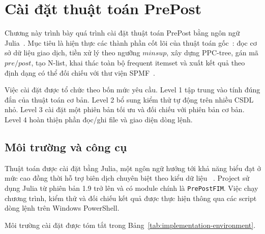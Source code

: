 \section{Cài đặt thuật toán PrePost}
\label{sec:implementation}

Chương này trình bày quá trình cài đặt thuật toán PrePost bằng ngôn ngữ
Julia~\cite{bezanson2017julia}. Mục tiêu là hiện thực các thành phần cốt lõi
của thuật toán gốc~\cite{deng2012prepost}: đọc cơ sở dữ liệu giao dịch, tiền xử
lý theo ngưỡng $\mathit{minsup}$, xây dựng PPC-tree, gán mã $pre/post$, tạo
N-list, khai thác toàn bộ frequent itemset và xuất kết quả theo định dạng có
thể đối chiếu với thư viện SPMF~\cite{fournier2014spmf,spmfwebsite}.

Việc cài đặt được tổ chức theo bốn mức yêu cầu. Level 1 tập trung vào tính đúng đắn của thuật toán cơ bản. Level 2 bổ sung kiểm thử tự động trên nhiều CSDL nhỏ. Level 3 cài đặt một phiên bản tối ưu và đối chiếu với phiên bản cơ bản. Level 4 hoàn thiện phần đọc/ghi file và giao diện dòng lệnh.

\subsection{Môi trường và công cụ}
\label{subsec:implementation-environment}

Thuật toán được cài đặt bằng Julia, một ngôn ngữ hướng tới khả năng biểu đạt
ở mức cao đồng thời hỗ trợ biên dịch chuyên biệt theo kiểu dữ liệu
~\cite{bezanson2017julia}. Project sử dụng Julia từ phiên bản 1.9 trở lên và có
module chính là \texttt{PrePostFIM}. Việc chạy chương trình, kiểm thử và đối
chiếu kết quả được thực hiện thông qua các script dòng lệnh trên Windows
PowerShell.

Môi trường cài đặt được tóm tắt trong Bảng~\ref{tab:implementation-environment}.

